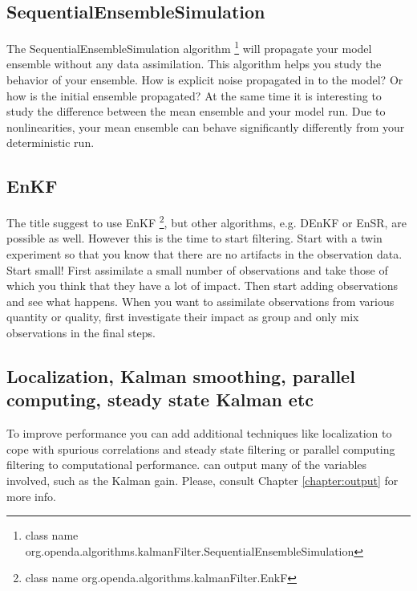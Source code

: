 \subsection{SequentialEnsembleSimulation}\label{Sec:SequentialEnsembleSimulation}
The SequentialEnsembleSimulation algorithm \footnote{class name org.openda.algorithms.kalmanFilter.SequentialEnsembleSimulation} will propagate your model ensemble without any data assimilation. This algorithm helps you study the behavior of your ensemble. How is explicit noise propagated in to the model? Or how is the initial ensemble propagated? At the same time it is interesting to study the difference between the mean ensemble and your model run. Due to nonlinearities, your mean ensemble can behave significantly differently from your deterministic run.

\subsection{EnKF}
The title suggest to use EnKF  \footnote{class name org.openda.algorithms.kalmanFilter.EnkF}, but other algorithms, e.g. DEnKF or EnSR, are possible as well. However this is the time to start filtering. Start with a twin experiment so that you know that there are no artifacts in the observation data. Start small! First assimilate a small number of observations and take those of which you think that they have a lot of impact. Then start adding observations and see what happens. When you want to assimilate observations from various quantity or quality, first investigate their impact as group and only mix observations in the final steps.

\subsection{Localization, Kalman smoothing, parallel computing, steady state Kalman etc}
To improve performance you can add additional techniques like localization to cope with spurious correlations and steady state filtering or parallel computing filtering to computational performance. \oda can output many of the variables involved, such as the Kalman gain. Please, consult Chapter \ref{chapter:output} for more info.


